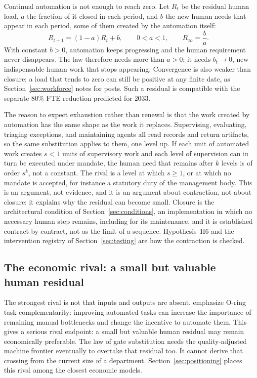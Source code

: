 Continual automation is not enough to reach zero. Let $R_t$ be the residual human load, $a$ the
fraction of it closed in each period, and $b$ the new human needs that appear in each period, some of
them created by the automation itself:
\begin{equation}
R_{t+1}=(1-a)R_t+b,\qquad 0<a<1,\qquad R_\infty=\frac{b}{a}. \label{eq:renewal}
\end{equation}
With constant $b>0$, automation keeps progressing and the human requirement never disappears. The law
therefore needs more than $a>0$: it needs $b_t\to 0$, new indispensable human work that stops
appearing. Convergence is also weaker than closure: a load that tends to zero can still be positive at
any finite date, as Section~\ref{sec:workforce} notes for posts. Such a residual is compatible
with the separate 80\% FTE reduction predicted for 2033.

The reason to expect exhaustion rather than renewal is that the work created by automation has the
same shape as the work it replaces. Supervising, evaluating, triaging exceptions, and maintaining
agents all read records and return artifacts, so the same substitution applies to them, one level up.
If each unit of automated work creates $s<1$ units of supervisory work and each level of supervision
can in turn be executed under mandate, the human need that remains after $k$ levels is of order $s^k$,
not a constant. The rival is a level at which $s\ge 1$, or at which no mandate is accepted, for
instance a statutory duty of the management body. This is an argument, not evidence, and it is an argument about contraction, not about closure: it
explains why the residual can become small. Closure is the architectural condition of
Section~\ref{sec:conditions}, an implementation in which no necessary human step remains, including
for its maintenance, and it is established contract by contract, not as the limit of a sequence.
Hypothesis~H6 and the intervention registry of Section~\ref{sec:testing} are how the contraction is
checked.

\subsection{The economic rival: a small but valuable human residual}

The strongest rival is not that inputs and outputs are absent. \citet{gans2026} emphasize O-ring task
complementarity: improving automated tasks can increase the importance of remaining manual bottlenecks
and change the incentive to automate them. This gives a serious rival endpoint: a small but valuable
human residual may remain economically preferable. The law of gate substitution needs the quality-adjusted machine
frontier eventually to overtake that residual too. It cannot derive that crossing from the current
size of a department. Section~\ref{sec:positioning} places this rival among the closest economic models.
